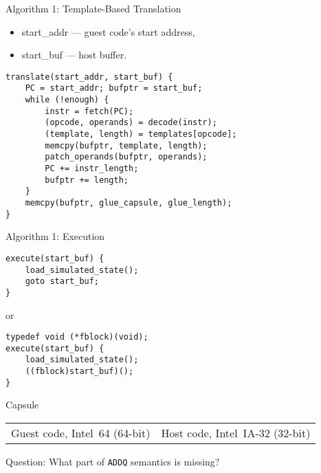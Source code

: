 \begin{frame}[fragile]{Algorithm 1: Template-Based Translation}
\begin{tiny}
\begin{itemize}
    \item start_addr --- guest code's start address,
    \item start_buf --- host buffer.
\end{itemize}
\end{tiny}

\begin{lstlisting}
translate(start_addr, start_buf) {
    PC = start_addr; bufptr = start_buf;
    while (!enough) {
        instr = fetch(PC);
        (opcode, operands) = decode(instr);
        (template, length) = templates[opcode];
        memcpy(bufptr, template, length);
        patch_operands(bufptr, operands);
        PC += instr_length;
        bufptr += length;
    }
    memcpy(bufptr, glue_capsule, glue_length);
}
\end{lstlisting}
\end{frame}

\begin{frame}[fragile]{Algorithm 1: Execution}

\begin{lstlisting}
execute(start_buf) {
    load_simulated_state();
    goto start_buf;
}
\end{lstlisting}
\pause
or
\begin{lstlisting}
typedef void (*fblock)(void);
execute(start_buf) {
    load_simulated_state();
    ((fblock)start_buf)();
}
\end{lstlisting}
\end{frame}

\begin{frame}{Capsule}
\begin{small}
\begin{tabular}{p{}p{}}
Guest code, Intel~64 (64-bit) & Host code, Intel~IA-32 (32-bit)
\end{tabular}
\end{small}
\vfill
\centering
{}
\pause
Question: What part of \texttt{ADDQ} semantics is missing?
\end{frame}

